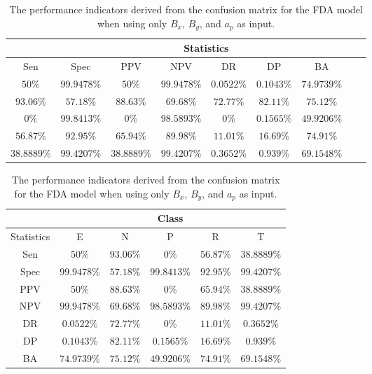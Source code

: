 \begin{table}[!ht]
	\centering
	\begin{tabular}{|c|c|c|c|c|c|c|c|c|}
		\hline
		 & \multicolumn{7}{c|}{Statistics} \\ \hline
		Sen & Spec & PPV & NPV & DR & DP & BA \\ \hline
		$50\%$ & $99.9478\%$ & $50\%$ & $99.9478\%$ & $0.0522\%$ & $0.1043\%$ & $74.9739\%$ \\ \hline
		$93.06\%$ & $57.18\%$ & $88.63\%$ & $69.68\%$ & $72.77\%$ & $82.11\%$ & $75.12\%$ \\ \hline
		$0\%$ & $99.8413\%$ & $0\%$ & $98.5893\%$ & $0\%$ & $0.1565\%$ & $49.9206\%$ \\ \hline
		$56.87\%$ & $92.95\%$ & $65.94\%$ & $89.98\%$ & $11.01\%$ & $16.69\%$ & $74.91\%$ \\ \hline
		$38.8889\%$ & $99.4207\%$ & $38.8889\%$ & $99.4207\%$ & $0.3652\%$ & $0.939\%$ & $69.1548\%$ \\ \hline
	\end{tabular}
	\caption{The performance indicators derived from the confusion matrix for the FDA model when using only $B_{x}$, $B_{y}$, and $a_{p}$ as input.}
	\label{tab:cs:xyap:fda}
\end{table}

\begin{table}[!ht]
	\centering
	\begin{tabular}{|c|c|c|c|c|c|}
		\hline
		 & \multicolumn{5}{c|}{Class} \\ \hline
		Statistics & E & N & P & R & T \\ \hline
		Sen & $50\%$ & $93.06\%$ & $0\%$ & $56.87\%$ & $38.8889\%$ \\ \hline
		Spec & $99.9478\%$ & $57.18\%$ & $99.8413\%$ & $92.95\%$ & $99.4207\%$ \\ \hline
		PPV & $50\%$ & $88.63\%$ & $0\%$ & $65.94\%$ & $38.8889\%$ \\ \hline
		NPV & $99.9478\%$ & $69.68\%$ & $98.5893\%$ & $89.98\%$ & $99.4207\%$ \\ \hline
		DR & $0.0522\%$ & $72.77\%$ & $0\%$ & $11.01\%$ & $0.3652\%$ \\ \hline
		DP & $0.1043\%$ & $82.11\%$ & $0.1565\%$ & $16.69\%$ & $0.939\%$ \\ \hline
		BA & $74.9739\%$ & $75.12\%$ & $49.9206\%$ & $74.91\%$ & $69.1548\%$ \\ \hline
	\end{tabular}
	\caption{The performance indicators derived from the confusion matrix for the FDA model when using only $B_{x}$, $B_{y}$, and $a_{p}$ as input.}
	\label{tab:cs:reverse:xyap:fda}
\end{table}

